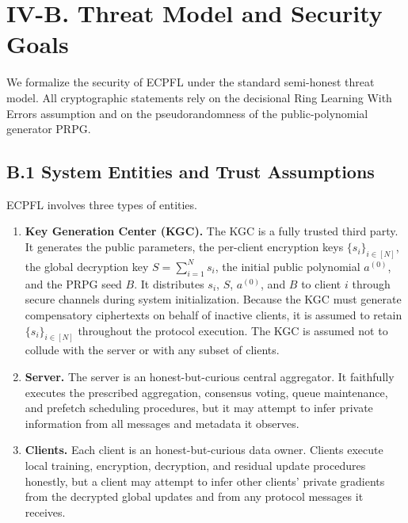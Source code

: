 \documentclass[10pt]{article}
\begin{document}

\section*{IV-B. Threat Model and Security Goals}

We formalize the security of ECPFL under the standard semi-honest threat model. All cryptographic statements rely on the decisional Ring Learning With Errors assumption and on the pseudorandomness of the public-polynomial generator PRPG.

\subsection*{B.1 System Entities and Trust Assumptions}

ECPFL involves three types of entities.

\begin{enumerate}
    \item \textbf{Key Generation Center (KGC).} The KGC is a fully trusted third party. It generates the public parameters, the per-client encryption keys $\{s_i\}_{i\in[N]}$, the global decryption key $S=\sum_{i=1}^N s_i$, the initial public polynomial $a^{(0)}$, and the PRPG seed $B$. It distributes $s_i$, $S$, $a^{(0)}$, and $B$ to client $i$ through secure channels during system initialization. Because the KGC must generate compensatory ciphertexts on behalf of inactive clients, it is assumed to retain $\{s_i\}_{i\in[N]}$ throughout the protocol execution. The KGC is assumed not to collude with the server or with any subset of clients.

    \item \textbf{Server.} The server is an honest-but-curious central aggregator. It faithfully executes the prescribed aggregation, consensus voting, queue maintenance, and prefetch scheduling procedures, but it may attempt to infer private information from all messages and metadata it observes.

    \item \textbf{Clients.} Each client is an honest-but-curious data owner. Clients execute local training, encryption, decryption, and residual update procedures honestly, but a client may attempt to infer other clients' private gradients from the decrypted global updates and from any protocol messages it receives.
\end{enumerate}
\end{document}
